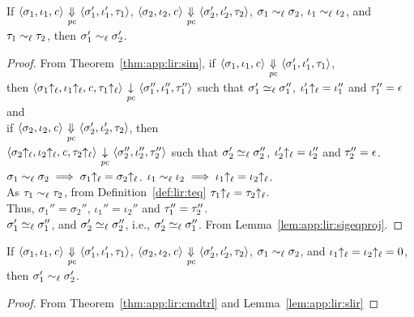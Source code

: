 \begin{myLemma}
\label{lem:app:lir:slir}
If $\langle \sigma_1, \iota_1, \mathit{c} \rangle
{~\underset{\mathit{pc}}{\Downarrow}~} \langle \sigma_1', \iota_1', \tau_1 \rangle$, 
$\langle \sigma_2, \iota_2, \mathit{c} \rangle
{~\underset{\mathit{pc}}{\Downarrow}~} \langle \sigma_2', \iota_2', \tau_2 \rangle$, 
$\sigma_1 \sim_\ell \sigma_2$, $\iota_1 \sim_\ell \iota_2$, and $\tau_1
\sim_\ell \tau_2$, then $\sigma_1' \sim_\ell \sigma_2'$.
\end{myLemma}
\begin{proof}
From Theorem~\ref{thm:app:lir:sim},  if $\langle \sigma_1, \iota_1, \mathit{c}
\rangle {~\underset{\mathit{pc}}{\Downarrow}~} \langle \sigma_1', \iota_1', \tau_1 \rangle$,\\ then
$\langle  \sigma_1{\uparrow_\ell}, \iota_1{\uparrow_\ell}, \mathit{c}, \tau_1{\uparrow_\ell} 
\rangle  {~\underset{\mathit{pc}}{\downarrow}~} \langle \sigma_1'',\iota_1'',
\tau_1'' \rangle$ such that $\sigma_1' \simeq_\ell \sigma_1''$,
$\iota_1'{\uparrow_\ell} = \iota_1''$ and $\tau_1'' = \epsilon$ and \\
if $\langle \sigma_2, \iota_2, \mathit{c} \rangle {~\underset{\mathit{pc}}{\Downarrow}~} \langle
\sigma_2', \iota_2', \tau_2 \rangle$, then \\ $\langle  
\sigma_2{\uparrow_\ell}, \iota_2{\uparrow_\ell}, \mathit{c}, \tau_2{\uparrow_\ell} 
\rangle  {~\underset{\mathit{pc}}{\downarrow}~} \langle \sigma_2'',\iota_2'',
\tau_2'' \rangle$ such that $\sigma_2' \simeq_\ell \sigma_2''$,
$\iota_2'{\uparrow_\ell} = \iota_2''$ and $\tau_2'' = \epsilon$.\\
$\sigma_1 \sim_\ell \sigma_2 \implies \sigma_1{\uparrow_\ell} = \sigma_2{\uparrow_\ell}$. 
$\iota_1 \sim_\ell \iota_2 \implies \iota_1{\uparrow_\ell} = \iota_2{\uparrow_\ell}$. \\
As $\tau_1 \sim_\ell \tau_2$, from Definition~\ref{def:lir:teq}
$\tau_1{\uparrow_\ell} = \tau_2{\uparrow_\ell}$. \\ 
Thus, $\sigma_1'' = \sigma_2''$, $\iota_1'' = \iota_2''$ and
$\tau_1'' = \tau_2''$. \\
$\sigma_1' \simeq_\ell \sigma_1''$, and $\sigma_2' \simeq_\ell
\sigma_2''$, i.e., $\sigma_2' \simeq_\ell \sigma_1''$. 
From Lemma~\ref{lem:app:lir:sigeqproj}.
\end{proof}

\begin{mycor}
\label{cor:app:lir:ni}
If $\langle \sigma_1, \iota_1, \mathit{c} \rangle
{~\underset{\mathit{pc}}{\Downarrow}~} \langle \sigma_1', \iota_1', \tau_1 \rangle$, 
 $\langle \sigma_2, \iota_2, \mathit{c} \rangle
{~\underset{\mathit{pc}}{\Downarrow}~} \langle \sigma_2', \iota_2', \tau_2 \rangle$, 
 $\sigma_1 \sim_\ell \sigma_2$, and $\iota_1{\uparrow_\ell} = \iota_2{\uparrow_\ell} = 0$, 
then $\sigma_1' \sim_\ell \sigma_2'$.
\end{mycor}
\begin{proof}
From Theorem~\ref{thm:app:lir:cmdtrl} and Lemma~\ref{lem:app:lir:slir}
\end{proof}

